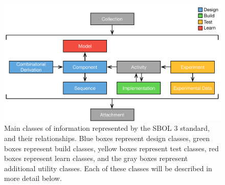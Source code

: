 
\begin{figure}[ht]
\begin{center}
\includegraphics[scale=0.85]{images/SBOL3-top-levels.pdf}
\caption{Main classes of information represented by the SBOL 3 standard, and their relationships.  Blue boxes represent design classes, green boxes represent build classes, yellow boxes represent test classes, red boxes represent learn classes, and the gray boxes represent additional utility classes.  Each of these classes will be described in more detail below.}
\label{images:overview2}
\end{center}
\end{figure}

